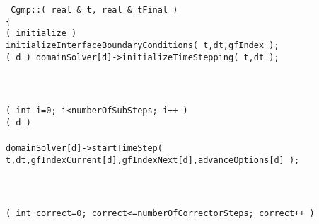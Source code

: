\begin{flushleft}\tt\small
Cgmp::( real \& t, real \& tFinal ) \\
\{  \\
\ia  \IF( initialize ) \\
\ib    initializeInterfaceBoundaryConditions( t,dt,gfIndex );  \\
\ib    \ForDomain( d ) domainSolver[d]->initializeTimeStepping( t,dt );\\
\ia  \END \\
\ia \\
\ia  {}\\
\ia  \FOR( int i=0; i<numberOfSubSteps; i++ )\\
\ib    \ForDomain( d )\\
\ic      {} \\
\ic      domainSolver[d]->startTimeStep( t,dt,gfIndexCurrent[d],gfIndexNext[d],advanceOptions[d] );\\
\ib    \END \\
\ib \\
\ib    {} \\
\ib    \FOR( int correct=0; correct<=numberOfCorrectorSteps; correct++ ) \\

\end{flushleft}
